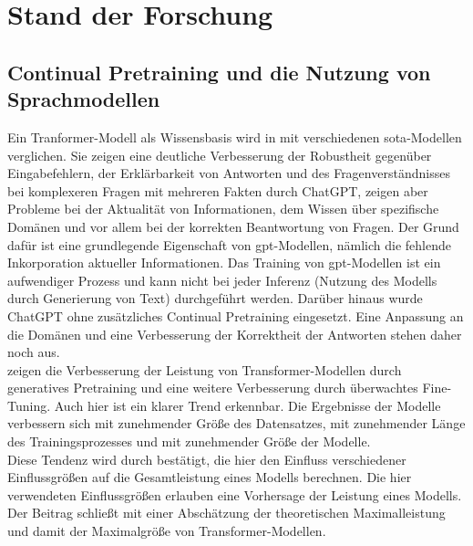 \chapter{Stand der Forschung}\label{ch:relatedWork}
\section{Continual Pretraining und die Nutzung von Sprachmodellen}

Ein Tranformer-Modell als Wissensbasis wird in \citet{chatgpt_qas} mit verschiedenen \ac{sota}-Modellen verglichen. 
Sie zeigen eine deutliche Verbesserung der Robustheit gegenüber Eingabefehlern, der Erklärbarkeit von Antworten und des Fragenverständnisses bei komplexeren Fragen mit mehreren Fakten durch ChatGPT, zeigen aber Probleme bei der Aktualität von Informationen, dem Wissen über spezifische Domänen und vor allem bei der korrekten Beantwortung von Fragen. 
Der Grund dafür ist eine grundlegende Eigenschaft von \ac{gpt}-Modellen, nämlich die fehlende Inkorporation aktueller Informationen. 
Das Training von \ac{gpt}-Modellen ist ein aufwendiger Prozess und kann nicht bei jeder Inferenz (Nutzung des Modells durch Generierung von Text) durchgeführt werden. 
Darüber hinaus wurde ChatGPT ohne zusätzliches Continual Pretraining eingesetzt.
Eine Anpassung an die Domänen und eine Verbesserung der Korrektheit der Antworten stehen daher noch aus.\\

\citet{improve_language} zeigen die Verbesserung der Leistung von Transformer-Modellen durch generatives Pretraining und eine weitere Verbesserung durch überwachtes Fine-Tuning.
Auch hier ist ein klarer Trend erkennbar. Die Ergebnisse der Modelle verbessern sich mit zunehmender Größe des Datensatzes, mit zunehmender Länge des Trainingsprozesses und mit zunehmender Größe der Modelle.\\

Diese Tendenz wird durch \citet{scaling_laws} bestätigt, die hier den Einfluss verschiedener Einflussgrößen auf die Gesamtleistung eines Modells berechnen. Die hier verwendeten Einflussgrößen erlauben eine Vorhersage der Leistung eines Modells. 
Der Beitrag schließt mit einer Abschätzung der theoretischen Maximalleistung und damit der Maximalgröße von Transformer-Modellen.\\

